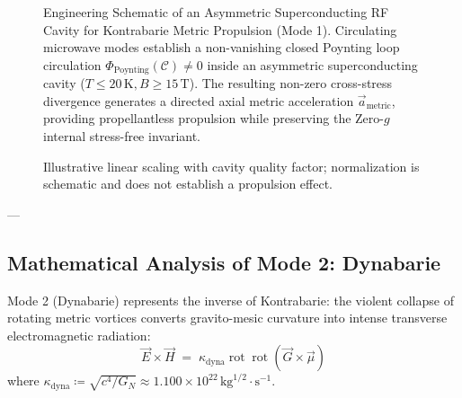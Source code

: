 \documentclass[
    12pt,
    a4paper,
    headings=normal,
    twoside=false,
    open=any,
    parskip=half
]{scrbook}
\begin{document}
\begin{figure}[htbp]
\caption{Engineering Schematic of an Asymmetric Superconducting RF Cavity for Kontrabarie Metric Propulsion (Mode 1). Circulating microwave modes establish a non-vanishing closed Poynting loop circulation $\Phi_{\text{Poynting}}(\mathcal{C}) \ne 0$ inside an asymmetric superconducting cavity ($T \le 20\,\text{K}, B \ge 15\,\text{T}$). The resulting non-zero cross-stress divergence generates a directed axial metric acceleration $\vec{a}_{\text{metric}}$, providing propellantless propulsion while preserving the Zero-$g$ internal stress-free invariant.}
\label{fig:ch6_superconducting_cavity_kontrabarie}
\end{figure}
\begin{figure}[htbp]\centering
{}
\caption{Illustrative linear scaling with cavity quality factor; normalization is schematic and does not establish a propulsion effect.}\label{fig:ch6_kontrabarie_thrust_scaling}\end{figure}

---

\subsection{Mathematical Analysis of Mode 2: Dynabarie}

Mode 2 (Dynabarie) represents the inverse of Kontrabarie: the violent collapse of rotating metric vortices converts gravito-mesic curvature into intense transverse electromagnetic radiation:
\begin{equation}
\vec{E} \times \vec{H} \;=\; \kappa_{\text{dyna}} \operatorname{rot}\operatorname{rot}\left( \vec{G} \times \vec{\mu} \right)
\label{eq:ch6_dynabarie_formula}
\end{equation}
where $\kappa_{\text{dyna}} \coloneqq \sqrt{c^4 / G_N} \approx 1.100 \times 10^{22}\,\text{kg}^{1/2}\cdot\text{s}^{-1}$.
\end{document}
